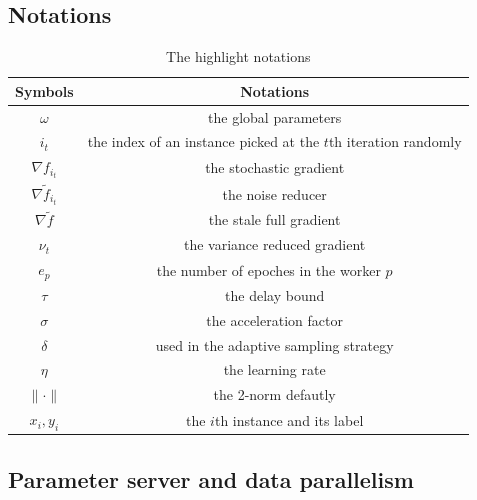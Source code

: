 \documentclass[preprint,review,11pt,a4paper]{elsarticle}
\begin{document}
\subsection{Notations}
\begin{table}[!t]
\centering
\scriptsize
\caption{The highlight notations} \label{tab:notations}
\begin{tabular}{|c|c|}
\hline 
Symbols & Notations\tabularnewline
\hline 
$\omega$ & the global parameters\tabularnewline
\hline 
$i_{t}$ & the index of an instance picked at the $t$th iteration randomly\tabularnewline
\hline 
$\nabla f_{i_{t}}$ & the stochastic gradient\tabularnewline
\hline 
$\nabla \tilde{f}_{i_t}$ & the noise reducer\tabularnewline
\hline 
$\nabla \tilde{f}$ & the stale full gradient\tabularnewline
\hline 
$\nu_t$ & the variance reduced gradient\tabularnewline
\hline 
$e_p$ & the number of epoches in the worker $p$\tabularnewline
\hline 
$\tau$ & the delay bound\tabularnewline
\hline 
$\sigma$ & the acceleration factor\tabularnewline
\hline 
$\delta$ & used in the adaptive sampling strategy \tabularnewline
\hline 
$\eta$ & the learning rate\tabularnewline
\hline 
$\parallel \cdot \parallel$ & the 2-norm defautly\tabularnewline
\hline 
$x_i, y_i$ & the $i$th instance and its label\tabularnewline
\hline 
\end{tabular}
\end{table}

\subsection{Parameter server and data parallelism}
\label{parameter server}
\end{document}
